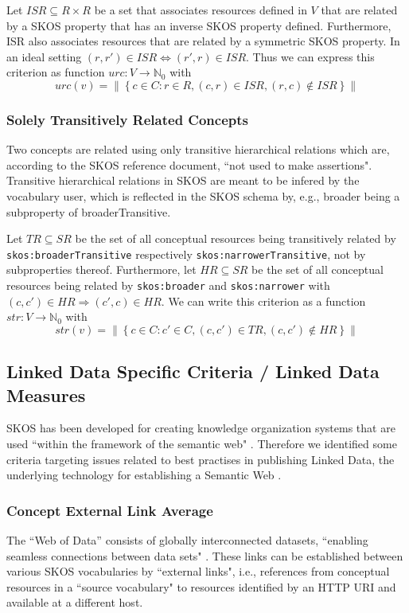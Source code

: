 \begin{definition}
Let \(ISR \subseteq R \times R\) be a set that associates resources defined in \(V\) that are related by a SKOS property that has an inverse SKOS property defined. Furthermore, ISR also associates resources that are related by a symmetric SKOS property. In an ideal setting \((r,r') \in ISR \iff (r',r) \in ISR\). Thus we can express this criterion as function \(urc:V \rightarrow \mathbb{N}_{0}\) with \[urc(v)=\left\|\left\{c \in C : r \in R, (c,r) \in ISR, (r,c) \notin ISR\right\}\right\|\]
\end{definition}

\subsubsection{Solely Transitively Related Concepts} Two concepts are related using only transitive hierarchical relations which are, according to the SKOS reference document, ``not used to make assertions". Transitive hierarchical relations in SKOS are meant to be infered by the vocabulary user, which is reflected in the SKOS schema by, e.g., broader being a subproperty of broaderTransitive.

\begin{definition}
Let \(TR \subseteq SR\) be the set of all conceptual resources being transitively related by \texttt{skos:broaderTransitive} respectively \texttt{skos:narrowerTransitive}, not by subproperties thereof. Furthermore, let \(HR \subseteq SR\) be the set of all conceptual resources being related by \texttt{skos:broader} and \texttt{skos:narrower} with \((c,c') \in HR \Rightarrow (c',c) \in HR\). We can write this criterion as a function \(str:V \rightarrow \mathbb{N}_{0}\) with \[str(v)=\left\|\left\{c \in C : c' \in C, (c,c') \in TR, (c,c') \notin HR\right\}\right\|\]
\end{definition}

\subsection{Linked Data Specific Criteria / Linked Data Measures}
SKOS has been developed for creating knowledge organization systems that are used ``within the framework of the semantic web" \cite{Bernerslee2001}. Therefore we identified some criteria targeting issues related to best practises in publishing Linked Data, the underlying technology for establishing a Semantic Web \cite{Heath2011}.

\subsubsection{Concept External Link Average} The ``Web of Data'' consists of globally interconnected datasets, ``enabling seamless connections between data sets" \cite{Heath2011}. These links can be established between various SKOS vocabularies by ``external links", i.e., references from conceptual resources in a ``source vocabulary" to resources identified by an HTTP URI and available at a different host.

